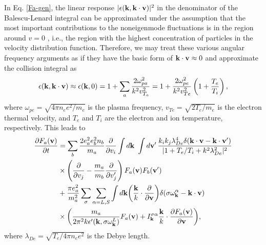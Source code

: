 \documentclass[12pt,a4paper,ruledheader]{report}
\begin{document}
In Eq. \eqref{Fa-gen}, the linear response $|\epsilon({\bf k},
{\bf k\cdot v})|^2$ in the denominator of the Balescu-Lenard
integral can be approximated under the assumption that the most
important contributions to the noneigenmode fluctuations is in
the region around $v=0$ , i.e., the region with the highest
concentration of particles in the velocity distribution function.
Therefore, we may treat these various angular frequency arguments
as if they have the basic form of ${\bf k \cdot v}\approx 0$ and
approximate the collision integral as
\begin{equation}
  \label{approx}
  \epsilon({\bf k},{\bf k \cdot v})\approx
  \epsilon({\bf k},0)=1+\sum_a \frac{2 \omega_{pa}^2}{k^2v_{T_a}^2}
  =1+\frac{2 \omega_{pe}^2}{k^2v_{Te}^2}\left( 1+\frac{T_e}{T_i} \right),
\end{equation}
where $\omega_{pe}=\sqrt{4 \pi n_e e^2/m_e}$ is the plasma frequency,
$v_{Te}= \sqrt{2T_e/m_e}$ is the electron thermal velocity, and $T_e$
and $T_i$ are the electron and ion temperature, respectively. This
leads to
\begin{equation}
\begin{split}
  \frac{\partial F_a({\bf v})}{\partial t}
  &=\sum_b\frac{2e_a^2e_b^2n_b}{m_a}\frac{\partial }{\partial v_i}
  \int d{\bf k}\ \int d{\bf v'}\,
  \frac{k_ik_j\lambda_{De}^4\delta({\bf k \cdot v - k \cdot v'})}
    {|1+T_e/T_i+k^2 \lambda_{De}^2|^2}\\
  &\times \left(\frac{\partial }{\partial v_j} -\frac{m_a}{m_b}
    \frac{\partial }{\partial v'_j}\right)
  F_a({\bf v})F_b({\bf v'})\\
  &+\frac{\pi e_a^2}{m_a^2}\sum_\sigma\sum_{\alpha=L,S}
  \int d{\bf k} \biggl(\frac{\bf k}{k}
\cdot\frac{\partial}{\partial{\bf v}}\biggr)
\delta(\sigma\omega_{\bf k}^\alpha-{\bf k}\cdot{\bf v})\\
&\times\biggl(\frac{m_a}{2\pi^2k\epsilon '({\bf k},\sigma\omega_{\bf k}^L)}
F_a({\bf v})+I_{\bf k}^{\sigma\alpha}
\frac{\bf k}{k}\cdot\frac{\partial F_a({\bf v})}{\partial{\bf v}}\biggr),
\end{split}
\label{Fa-gen-approx}
\end{equation}
where $\lambda_{De}=\sqrt{T_e/4\pi n_ee^2}$ is the Debye length.
\end{document}
